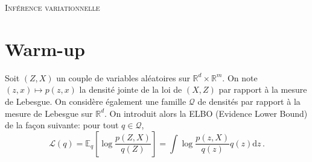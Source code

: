 \documentclass[a4paper,10pt,fleqn]{article}
\newcommand{\rset}{\ensuremath{\mathbb{R}}}
\newcommand{\1}{\ensuremath{\mathbbm{1}}}
\begin{document}

\noindent\hrulefill

\begin{center}
\textsc{Inf\'erence variationnelle}
\end{center}
\hrulefill

\medskip


\section{Warm-up}
Soit $(Z,X)$ un couple de variables al\'eatoires sur $\rset^d\times \rset^m$. On note $(z,x)\mapsto p(z,x)$ la densit\'e jointe de la loi de $(X,Z)$ par rapport \`a la mesure de Lebesgue. On consid\`ere \'egalement une famille $\mathcal{Q}$ de densit\'es par rapport \`a la mesure de Lebesgue sur $\rset^d$. On introduit alors la ELBO (Evidence Lower Bound) de la fa\c con suivante: pour tout $q\in\mathcal{Q}$,
$$
\mathcal{L}(q) = \mathbb{E}_q\left[\log\frac{p(Z,X)}{q(Z)}\right] = \int \log\frac{p(z,X)}{q(z)}q(z) \mathrm{d} z\,.
$$
\end{document}
